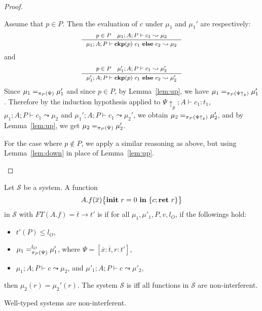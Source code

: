 {{{\begin{proof}
\begin{ProofEnumDesc}
Assume that $p \in P.$
Then the evaluation of $c$ under $\mu_1$ and $\mu_1'$
are respectively:
$$\myeqsize
\inference{p\in P \quad \mu_1; A; P \vdash c_1 \leadsto \mu_2}
{\mu_1; A ; P \vdash \lcCP{p}{c_1}{c_2} \leadsto \mu_2}
$$
and
$$\myeqsize
\inference
    {p\in P \quad \mu_1'; A; P \vdash c_1 \leadsto \mu_2'}
    {\mu_1'; A ; P \vdash \lcCP{p}{c_1}{c_2} \leadsto \mu_2'}
$$
Since $\mu_1 =_{\app{\Psi}{P}} \mu_1'$ and since $p \in P$,
by Lemma~\ref{lem:up}, we have $\mu_1 =_{\app{\Psi\uparrow_p}{P}} \mu_1'$.
Therefore by the induction hypothesis applied to $\Psi\uparrow_p ; A \vdash c_1 : t_1$,
$\mu_1; A; P \vdash c_1 \leadsto \mu_2$ and
$\mu_1'; A; P \vdash c_1 \leadsto \mu_2'$, we obtain
$\mu_2 =_{\app{\Psi\uparrow_p}{P}} \mu_2'$, and by Lemma~\ref{lem:up},
we get $\mu_2 =_{\app{\Psi}{P}} \mu_2'$.

For the case where $p \not \in P$, we apply a similar reasoning as above,
but using Lemma~\ref{lem:down} in place of Lemma~\ref{lem:up}.
\end{ProofEnumDesc}
\end{proof}


\begin{definition}\label{def:sys-ni}
Let $\mathcal{S}$ be a system.
A function
{\myeqsize$$\lpFUN{A.f}{\overline{x}}{c}$$}
in $\mathcal{S}$
with $FT(A.f) = \overline{t} \rightarrow t'$
is {}
if for all $\mu_1, \mu'_1, P, v, l_{O}$,
if the followings hold:
{\myeqsize
\begin{itemize}
\item $t'(P) \leq l_{O}$,
\item $\mu_1 =_{\app{\Psi}{P}}^{l_{O}} \mu'_1$, where
$\Psi = [\overline{x} : \overline{t}, r : t']$,
\item $\mu_1;A ; P\vdash c \leadsto \mu_2 $, and $\mu'_1; A; P\vdash c\leadsto \mu'_2 $,
\end{itemize}}
then $\mu_2(r) = \mu_2'(r).$
The system $\mathcal{S}$ is  iff all functions
in $\mathcal{S}$ are non-interferent.
\end{definition}

\begin{theorem}\label{thm:ni}
Well-typed systems are non-interferent.
\end{theorem}



}}}
